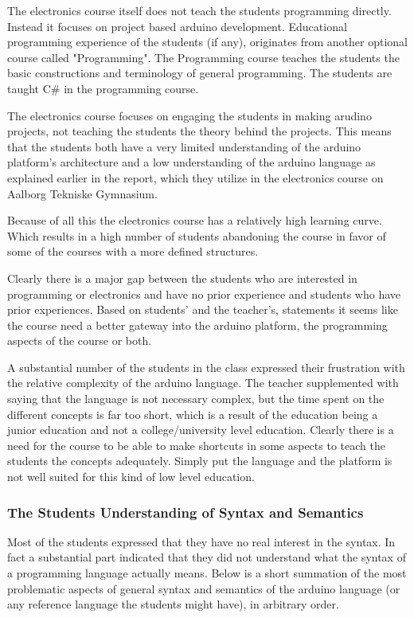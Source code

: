 The electronics course itself does not teach the students programming directly. 
Instead it focuses on project based arduino development. 
Educational programming experience of the students (if any), originates from another optional course called "Programming". 
The Programming course teaches the students the basic constructions and terminology of general programming. 
The students are taught C{\#} in the programming course. 

The electronics course focuses on engaging the students in making arudino projects, not teaching the students the theory behind the projects. 
This means that the students both have a very limited understanding of the arduino platform's architecture and a low understanding of the arduino language as explained earlier in the report, which they utilize in the electronics course on Aalborg Tekniske Gymnasium.

Because of all this the electronics course has a relatively high learning curve. 
Which results in a high number of students abandoning the course in favor of some of the courses with a more defined structures.

Clearly there is a major gap between the students who are interested in programming or electronics and have no prior experience and students who have prior experiences. 
Based on students' and the teacher's, statements it seems like the course need a better gateway into the arduino platform, the programming aspects of the course or both.

A substantial number of the students in the class expressed their frustration with the relative complexity of the arduino language. 
The teacher supplemented with saying that the language is not necessary complex, but the time spent on the different concepts is far too short, which is a result of the education being a junior education and not a college/university level education.
Clearly there is a need for the course to be able to make shortcuts in some aspects to teach the students the concepts adequately. 
Simply put the language and the platform is not well suited for this kind of low level education.

\subsubsection{The Students Understanding of Syntax and Semantics}
Most of the students expressed that they have no real interest in the syntax. 
In fact a substantial part indicated that they did not understand what the syntax of a programming language actually means. 
Below is a short summation of the most problematic aspects of general syntax and semantics of the arduino language (or any reference language the students might have), in arbitrary order.

